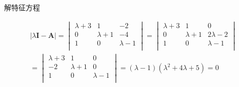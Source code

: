 \begin{examp}{解特征方程}

    \jie 
    \begin{gather*}
        \vert \lambda \mathbf{I}-\mathbf{A} \vert=
        \begin{vmatrix}
            \lambda+3  &   1   &   -2   \\
            0   &   \lambda+1  &   -4   \\
            1   &   0   &   \lambda-1  \\        
        \end{vmatrix}=
    \begin{vmatrix}
        \lambda+3  &   1   &   0   \\
        0   &   \lambda+1  &   2\lambda-2   \\
        1   &   0  &   \lambda-1  \\    
    \end{vmatrix} \\
    =\begin{vmatrix}
        \lambda+3  &   1   &   0   \\
        -2   &   \lambda+1  &   0   \\
        1   &   0   &   \lambda-1  \\       
    \end{vmatrix}=(\lambda-1)(\lambda^2+4\lambda+5)=0
    \end{gather*}
\end{examp}

